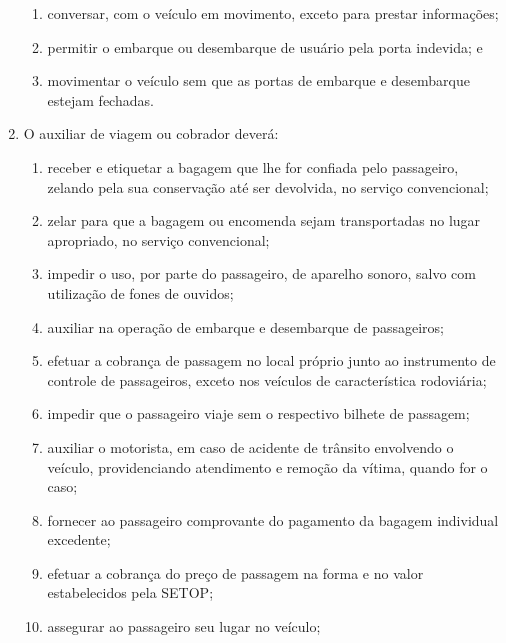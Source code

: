 \begin{enumerate}[resume, label=Art. \arabic*]
\begin{enumerate}[label=\roman*.]
\item conversar, com o veículo em movimento, exceto para prestar informações;

\item permitir o embarque ou desembarque de usuário pela porta indevida; e

\item movimentar o veículo sem que as portas de embarque e desembarque estejam fechadas.

\end{enumerate}

\item O auxiliar de viagem ou cobrador deverá:

\begin{enumerate}[label=\roman*.]

\item receber e etiquetar a bagagem que lhe for confiada pelo passageiro, zelando pela sua conservação até ser devolvida, no serviço convencional;

\item zelar para que a bagagem ou encomenda sejam transportadas no lugar apropriado, no serviço convencional;

\item impedir o uso, por parte do passageiro, de aparelho sonoro, salvo com utilização de fones de ouvidos;

\item auxiliar na operação de embarque e desembarque de passageiros;

\item efetuar a cobrança de passagem no local próprio junto ao instrumento de controle de passageiros, exceto nos veículos de característica rodoviária;

\item impedir que o passageiro viaje sem o respectivo bilhete de passagem;

\item auxiliar o motorista, em caso de acidente de trânsito envolvendo o veículo, providenciando atendimento e remoção da vítima, quando for o caso;

\item fornecer ao passageiro comprovante do pagamento da bagagem individual excedente;

\item efetuar a cobrança do preço de passagem na forma e no valor estabelecidos pela SETOP;

\item assegurar ao passageiro seu lugar no veículo;


\end{enumerate}
\end{enumerate}
